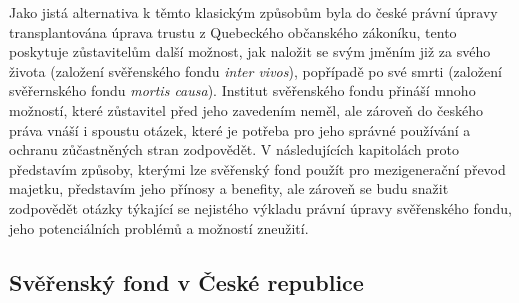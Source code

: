 \documentclass{article}
\begin{document}

Jako jistá alternativa k těmto klasickým způsobům byla do české právní úpravy transplantována úprava trustu z Quebeckého občanského zákoníku, tento poskytuje zůstavitelům další možnost, jak naložit se svým jměním již za svého života (založení svěřenského fondu \textit{inter vivos}), popřípadě po své smrti (založení svěřernského fondu \textit{mortis causa}). Institut svěřenského fondu přináší mnoho možností, které zůstavitel před jeho zavedením neměl, ale zároveň do českého práva vnáší i spoustu otázek, které je potřeba pro jeho správné používání a ochranu zůčastněných stran zodpovědět. V následujících kapitolách proto představím způsoby, kterými lze svěřenský fond použít pro mezigenerační převod majetku, představím jeho přínosy a benefity, ale zároveň se budu snažit zodpovědět otázky týkající se nejistého výkladu právní úpravy svěřenského fondu, jeho potenciálních problémů a možností zneužití. \\



\subsection{Svěřenský fond v České republice}


\end{document}
